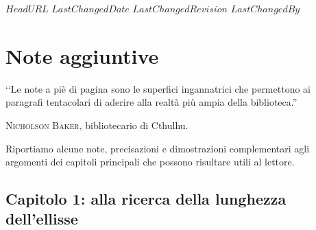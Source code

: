 \svnidlong
{$HeadURL$}
{$LastChangedDate$}
{$LastChangedRevision$}
{$LastChangedBy$}

\chapter{Note aggiuntive}
\begin{introduction}
‘‘Le note a piè di pagina sono le superfici ingannatrici che permettono ai paragrafi tentacolari di aderire alla realtà più ampia della biblioteca.''
\begin{flushright}
	\textsc{Nicholson Baker,} bibliotecario di Cthulhu.
\end{flushright}
\end{introduction}

\noindent Riportiamo alcune note, precisazioni e dimostrazioni complementari agli argomenti dei capitoli principali che possono risultare utili al lettore.
\section{Capitolo 1: alla ricerca della lunghezza dell'ellisse}
